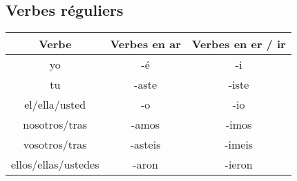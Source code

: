 \subsection{Verbes réguliers}
\begin{table}[hbt!]
    \centering
    \setlength\tabcolsep{20pt}
    \begin{tabular}{|c||c|c|}
         \hline
         Verbe              & Verbes en \textbf{ar} & Verbes en \textbf{er} / \textbf{ir} \\
         \hline
         \hline
         yo                 & -é              & -i              \\    
         \hline
         tu                 & -aste           & -iste           \\
         \hline
         el/ella/usted      & -o              & -io             \\
        \hline
        nosotros/tras       & -amos           & -imos           \\
        \hline
        vosotros/tras       & -asteis         & -imeis          \\
        \hline
        ellos/ellas/ustedes & -aron           & -ieron          \\
        \hline
    \end{tabular}
    \label{tab:label2}
\end{table}
